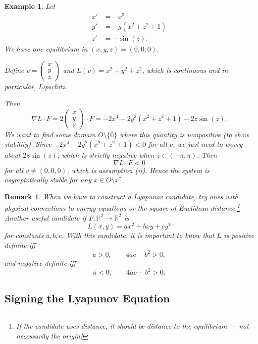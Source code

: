\documentclass{tufte-handout}
\newcommand*\R{\mathbb{R}}
\newtheorem{rmk}[thm]{Remark}
\newtheorem{ex}[thm]{Example}
\theoremstyle{definition}
\begin{document}
\begin{ex}
	Let 
	\begin{align*}
		x' &= -x^3 \\
		y' &= -y(x^2+z^2+1) \\
		z' &= -\sin{\left(z\right)}
	.\end{align*}
	We have one equilibrium in $(x,y,z) = (0,0,0)$.

	Define $v = \begin{pmatrix}
	x  \\
	y \\ z
	\end{pmatrix}$ and $L(v) = x^2+ y^2+z^2$, which is continuous and in particular, Lipschitz.

	Then \[
		\nabla L \cdot F = 2 \begin{pmatrix}
		x \\
		y \\ z
		\end{pmatrix} \cdot  F = -2x^{4} - 2y^2 (x^2 + z^2 + 1) - 2z \sin{\left(z\right)}
	.\] 
	We want to find some domain $O\setminus \{0\}$ where this quantity is nonpositive (to show stability).
	Since $-2x^{4} - 2y^2(x^2+ z^2 + 1) < 0$ for all $v$, we just need to worry about $2z \sin{\left(z\right)}$, which is strictly negative when $z \in (-\pi,\pi)$. Then \[
		\nabla L \cdot F < 0
	\] for all $v \ne (0,0,0)$, which is assumption (ii). Hence the system is asymptotically stable for any $x \in O \setminus x^*$. 
\end{ex}

\begin{rmk}
	When we have to construct a Lyapunov candidate, try ones with physical connections to energy equations or the square of Euclidean distance.\footnote{If the candidate uses distance, it should be distance to the \emph{equilibrium} --- not necessarily the origin!} Another useful candidate if $F: \R^2 \to \R^2$ is \[
		L(x,y) = ax^2 + bxy + cy^2
	\] for constants $a,b,c$. With this candidate, it is important to know that $L$ is positive definite iff \[
		a > 0, \qquad 4ac - b^2 > 0
	,\] and negative definite iff \[
		a < 0, \qquad 4ac - b^2 > 0
	.\]
\end{rmk}


\subsection{Signing the Lyapunov Equation}
\end{document}
